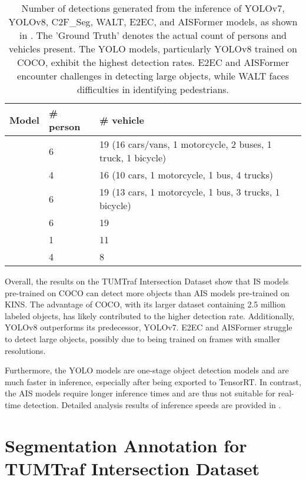 \begin{table}[htb]%
	\centering%
	\begin{tabular}{p{3cm} p{2cm} p{9cm}}
		\toprule
		\textbf{Model} & \textbf{\# person} & \textbf{\# vehicle} \\
		\midrule
		\code{Ground Truth} & 6 & 19 \small{(16 cars/vans, 1 motorcycle, 2 buses, 1 truck, 1 bicycle)} \\
		\code{YOLOv7\_coco} & 4 & 16 \small{(10 cars, 1 motorcycle, 1 bus, 4 trucks)} \\
		\code{YOLOv8x\_coco} & 6 & 19 \small{(13 cars, 1 motorcycle, 1 bus, 3 trucks, 1 bicycle)} \\
		\code{C2F\_Seg}&  6 & 19  \\
		\code{WALT} & 1 & 11 \\
		\code{E2EC}  & 4 & 8 \\
		\bottomrule
	\end{tabular}
	\caption{Number of detections generated from the inference of YOLOv7, YOLOv8, C2F\_Seg, WALT, E2EC, and AISFormer models, as shown in . The 'Ground Truth' denotes the actual count of persons and vehicles present. The YOLO models, particularly YOLOv8 trained on COCO, exhibit the highest detection rates. E2EC and AISFormer encounter challenges in detecting large objects, while WALT faces difficulties in identifying pedestrians.}
	\label{tab:compare_sota_is_ais}%
\end{table}

Overall, the results on the TUMTraf Intersection Dataset show that IS models pre-trained on COCO can detect more objects than AIS models pre-trained on KINS. The advantage of COCO, with its larger dataset containing 2.5 million labeled objects, has likely contributed to the higher detection rate. Additionally, YOLOv8 outperforms its predecessor, YOLOv7. E2EC and AISFormer struggle to detect large objects, possibly due to being trained on frames with smaller resolutions. 

Furthermore, the YOLO models are one-stage object detection models and are much faster in inference, especially after being exported to TensorRT. In contrast, the AIS models require longer inference times and are thus not suitable for real-time detection. Detailed analysis results of inference speeds are provided in .

\section{Segmentation Annotation for TUMTraf Intersection Dataset}  \label{sec:extend_annotation}

